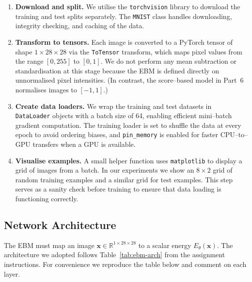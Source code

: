 \begin{enumerate}[leftmargin=*,label=\arabic*.]
  \item \textbf{Download and split.}  We utilise the \texttt{torchvision}
    library to download the training and test splits separately.  The
    \texttt{MNIST} class handles downloading, integrity checking, and
    caching of the data.
  \item \textbf{Transform to tensors.}  Each image is converted to a
    PyTorch tensor of shape $1\times 28\times 28$ via the
    \texttt{ToTensor} transform, which maps pixel values from the range
    $[0,255]$ to $[0,1]$.  We do not perform any mean subtraction or
    standardisation at this stage because the EBM is defined directly on
    unnormalised pixel intensities.  (In contrast, the score–based model in
    Part~6 normalises images to $[-1,1]$.)
  \item \textbf{Create data loaders.}  We wrap the training and test
    datasets in \texttt{DataLoader} objects with a batch size of 64, enabling
    efficient mini–batch gradient computation.  The training loader is set
    to shuffle the data at every epoch to avoid ordering biases, and
    \texttt{pin\_memory} is enabled for faster CPU–to–GPU transfers when a
    GPU is available.
  \item \textbf{Visualise examples.}  A small helper function uses
    \texttt{matplotlib} to display a grid of images from a batch.  In our
    experiments we show an $8\times 2$ grid of random training examples and
    a similar grid for test examples.  This step serves as a sanity check
    before training to ensure that data loading is functioning correctly.
\end{enumerate}

\subsection{Network Architecture}

The EBM must map an image $\mathbf{x}\in\mathbb{R}^{1\times 28\times 28}$
to a scalar energy $E_\theta(\mathbf{x})$.  The architecture we adopted
follows Table~\ref{tab:ebm-arch} from the assignment instructions.  For
convenience we reproduce the table below and comment on each layer.

